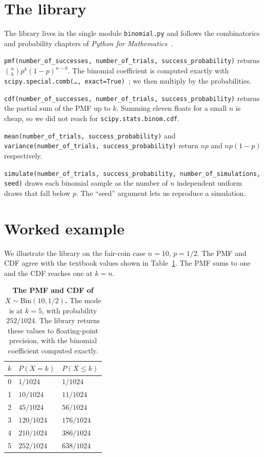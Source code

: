 \documentclass[11pt]{article}
\begin{document}
\section{The library}

The library lives in the single module \texttt{binomial.py} and
follows the combinatorics and probability chapters of \emph{Python
for Mathematics}~\cite{knight2024}.

\texttt{pmf(number\_of\_successes,
number\_of\_trials, success\_probability)} returns
\(\binom{n}{k} p^k (1 - p)^{n - k}\). The binomial coefficient is
computed exactly with \texttt{scipy.special.comb(\dots,
exact=True)}~\cite{virtanen2020}; we then multiply by the
probabilities.

\texttt{cdf(number\_of\_successes,
number\_of\_trials, success\_probability)} returns the partial sum
of the PMF up to \(k\). Summing eleven floats for a small \(n\) is
cheap, so we did not reach for \texttt{scipy.stats.binom.cdf}.

\texttt{mean(number\_of\_trials, success\_probability)} and
\texttt{variance(number\_of\_trials, success\_probability)} return
\(n p\) and \(n p (1 - p)\) respectively.

\texttt{simulate(number\_of\_trials, success\_probability,
number\_of\_simulations, seed)} draws each binomial sample as the
number of \(n\) independent uniform draws that fall below \(p\). The
``seed'' argument lets us reproduce a simulation.

\section{Worked example}

We illustrate the library on the fair-coin case \(n = 10\),
\(p = 1/2\). The PMF and CDF agree with the textbook values shown
in Table~\ref{tab:fair-coin}. The PMF sums to one and the CDF
reaches one at \(k = n\).

\begin{table}[h]
\centering
\begin{tabular}{r l l}
\toprule
\(k\) & \(P(X = k)\) & \(P(X \le k)\) \\
\midrule
0  & \(1/1024\)    & \(1/1024\) \\
1  & \(10/1024\)   & \(11/1024\) \\
2  & \(45/1024\)   & \(56/1024\) \\
3  & \(120/1024\)  & \(176/1024\) \\
4  & \(210/1024\)  & \(386/1024\) \\
5  & \(252/1024\)  & \(638/1024\) \\
\bottomrule
\end{tabular}
\caption{\textbf{The PMF and CDF of \(X \sim \text{Bin}(10, 1/2)\).}
The mode is at \(k = 5\), with probability \(252/1024\). The library
returns these values to floating-point precision, with the binomial
coefficient computed exactly.}
\label{tab:fair-coin}
\end{table}
\end{document}
